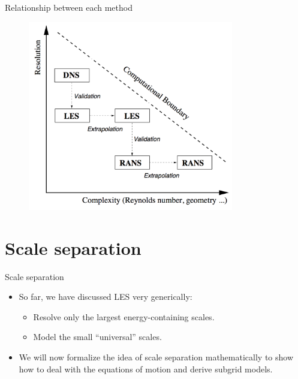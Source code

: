 
\begin{frame}{Relationship between each method}

\begin{figure}
	\includegraphics[width=0.8\textwidth]{methods2.png}
\end{figure}

\end{frame}

\section{Scale separation} %
\begin{frame}{Scale separation}

\begin{itemize}
	\item So far, we have discussed LES very generically:
	\begin{itemize}
		\item Resolve only the largest energy-containing scales.
		\item Model the small ``universal'' scales.
	\end{itemize}
	\item We will now formalize the idea of scale separation mathematically to show how to deal with the equations of motion and derive subgrid models.

\end{itemize}
\end{frame}

